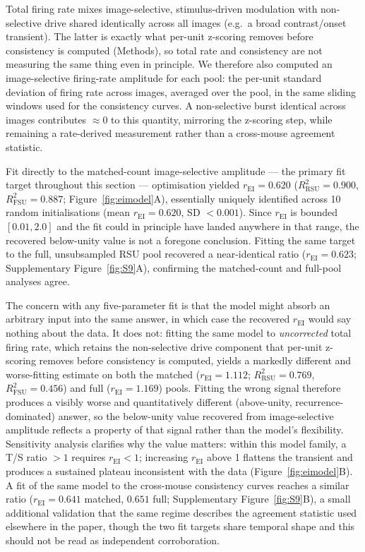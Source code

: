 \documentclass[11pt,onecolumn]{article}
\begin{document}
Total firing rate mixes image-selective, stimulus-driven modulation with
non-selective drive shared identically across all images (e.g.\ a broad
contrast/onset transient).  The latter is exactly what per-unit z-scoring
removes before consistency is computed (Methods), so total rate and
consistency are not measuring the same thing even in principle.  We
therefore also computed an image-selective firing-rate amplitude for
each pool: the per-unit standard deviation of firing rate across images,
averaged over the pool, in the same sliding windows used for the
consistency curves.  A non-selective burst identical across images
contributes $\approx 0$ to this quantity, mirroring the z-scoring step,
while remaining a rate-derived measurement rather than a cross-mouse
agreement statistic.

Fit directly to the matched-count image-selective amplitude --- the
primary fit target throughout this section --- optimisation yielded
$r_\mathrm{EI} = 0.620$ ($R^2_\mathrm{RSU} = 0.900$,
$R^2_\mathrm{FSU} = 0.887$; Figure~\ref{fig:eimodel}A), essentially
uniquely identified across 10 random initialisations (mean
$r_\mathrm{EI} = 0.620$, SD $< 0.001$).  Since $r_\mathrm{EI}$ is bounded
$[0.01, 2.0]$ and the fit could in principle have landed anywhere in that
range, the recovered below-unity value is not a foregone conclusion.
Fitting the same target to the full, unsubsampled RSU pool recovered a
near-identical ratio ($r_\mathrm{EI} = 0.623$; Supplementary
Figure~\ref{fig:S9}A), confirming the matched-count and full-pool
analyses agree.

The concern with any five-parameter fit is that the model might absorb an
arbitrary input into the same answer, in which case the recovered
$r_\mathrm{EI}$ would say nothing about the data.  It does not: fitting
the same model to \textit{uncorrected} total firing rate, which retains
the non-selective drive component that per-unit z-scoring removes before
consistency is computed, yields a markedly different and worse-fitting
estimate on both the matched ($r_\mathrm{EI} = 1.112$;
$R^2_\mathrm{RSU} = 0.769$, $R^2_\mathrm{FSU} = 0.456$) and full
($r_\mathrm{EI} = 1.169$) pools.  Fitting the wrong signal therefore
produces a visibly worse and quantitatively different (above-unity,
recurrence-dominated) answer, so the below-unity value recovered from
image-selective amplitude reflects a property of that signal rather than
the model's flexibility.  Sensitivity analysis clarifies why the value
matters: within this model family, a T/S ratio $> 1$ requires
$r_\mathrm{EI} < 1$; increasing $r_\mathrm{EI}$ above 1 flattens the
transient and produces a sustained plateau inconsistent with the data
(Figure~\ref{fig:eimodel}B).  A fit of the same model to the cross-mouse
consistency curves reaches a similar ratio ($r_\mathrm{EI} = 0.641$
matched, $0.651$ full; Supplementary Figure~\ref{fig:S9}B), a small
additional validation that the same regime describes the agreement
statistic used elsewhere in the paper, though the two fit targets share
temporal shape and this should not be read as independent corroboration.
\end{document}
